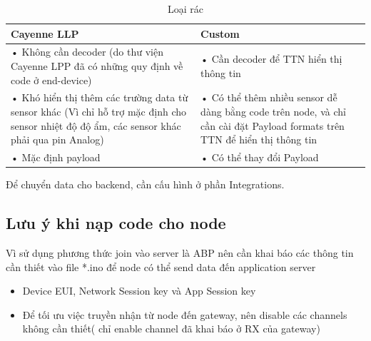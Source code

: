 \begin{table}[H]
    \centering
    \caption{Loại rác} 
    \label{tab.comparison.Cayenne}
    \begin{tabular}{| m{6cm} | m{6cm} |}
        \hline
        Cayenne LLP & Custom \\

        \hline
        •	Không cần decoder (do thư viện Cayenne LPP đã có những quy định về code ở end-device) & •	Cần decoder để TTN hiển thị thông tin \\
        •	Khó hiển thị thêm các trường data từ sensor khác (Vì chỉ  hỗ trợ mặc định cho sensor nhiệt độ độ ẩm, các sensor khác phải qua pin Analog) & •	Có thể thêm nhiều sensor dễ dàng bằng code trên node, và chỉ cần cài đặt Payload formats trên TTN để hiển thị thông tin \\
        •	Mặc định payload & •	Có thể thay đổi Payload \\
        
        \hline
    \end{tabular}
\end{table}

Để chuyển data cho backend, cần cấu hình ở phần Integrations.



\subsection{Lưu ý khi nạp code cho node}

Vì sử dụng phương thức join vào server là ABP nên cần khai báo các thông tin cần thiết vào file *.ino để node có thể send data đến application server 

\begin{itemize}
    \item Device EUI, Network Session key và App Session key
    \item Để tối ưu việc truyền nhận từ node đến gateway,  nên disable các channels không cần thiết( chỉ enable channel đã khai báo ở RX của gateway)
\end{itemize}



